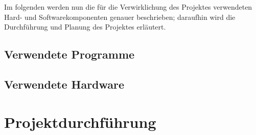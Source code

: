 \documentclass[a4paper,12pt]{article}
\begin{document}
Im folgenden werden nun die für die Verwirklichung des Projektes verwendeten Hard- und Softwarekomponenten genauer beschrieben; daraufhin wird die Durchführung und Planung des Projektes erläutert.
\pagebreak

\subsection{Verwendete Programme}
\pagebreak

\subsection{Verwendete Hardware}

\pagebreak
\section{Projektdurchführung}
\end{document}
